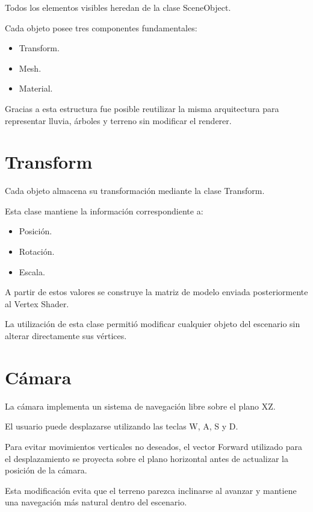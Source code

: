 Todos los elementos visibles heredan de la clase SceneObject.

Cada objeto posee tres componentes fundamentales:

\begin{itemize}

\item Transform.

\item Mesh.

\item Material.

\end{itemize}

Gracias a esta estructura fue posible reutilizar la misma arquitectura para representar lluvia, árboles y terreno sin modificar el renderer.

\section{Transform}

Cada objeto almacena su transformación mediante la clase Transform.

Esta clase mantiene la información correspondiente a:

\begin{itemize}

\item Posición.

\item Rotación.

\item Escala.

\end{itemize}

A partir de estos valores se construye la matriz de modelo enviada posteriormente al Vertex Shader.

La utilización de esta clase permitió modificar cualquier objeto del escenario sin alterar directamente sus vértices.


\section{Cámara}

La cámara implementa un sistema de navegación libre sobre el plano XZ.

El usuario puede desplazarse utilizando las teclas W, A, S y D.

Para evitar movimientos verticales no deseados, el vector Forward utilizado para el desplazamiento se proyecta sobre el plano horizontal antes de actualizar la posición de la cámara.

Esta modificación evita que el terreno parezca inclinarse al avanzar y mantiene una navegación más natural dentro del escenario.